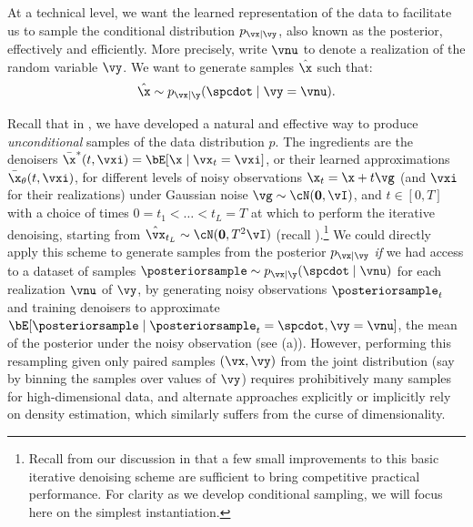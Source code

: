 \documentclass[../../book-main.tex]{subfiles}
\begin{document}
At a technical level, we want the learned representation of the data
to facilitate us to sample the conditional distribution $p_{\vx\mid
\vy}$, also known as the posterior, effectively and efficiently. More precisely,
write $\vnu$ to denote a realization of the random variable $\vy$.
We want to generate samples $\hat{\x}$ such that:
\begin{equation}\label{eq:goal-sample-posterior}
    \hat{\x} \sim   p_{\vx \mid \y}(\spcdot \mid \vy=\vnu).
\end{equation}

Recall that in , we have developed a natural and
effective way to produce \textit{unconditional} samples of the data distribution
$p$. The ingredients are the denoisers $\bar{\x}^\ast(t, \vxi) = \bE[ \x \mid
\vx_t=\vxi ]$, or their learned approximations $\bar{\x}_{\theta}(t, \vxi)$,
for different levels of noisy observations $\x_t = \x + t \vg$ (and $\vxi$ for
their realizations) under
Gaussian noise $\vg \sim \cN(\mathbf{0}, \vI)$, and $t \in
[0, T]$ with a choice of times $0 = t_1 < \dots < t_{L} = T$ at which to
perform the iterative denoising, starting from $\hat{\vx}_{t_L} \sim
\cN(\mathbf{0}, T^2 \vI)$ (recall
).\footnote{Recall from our
    discussion in 
    that a few small improvements to this basic iterative denoising scheme are
    sufficient to bring competitive practical performance. For
    clarity as we develop
conditional sampling, we will focus here on the simplest instantiation.}
We could directly apply this scheme to generate samples from the posterior
$p_{\vx \mid \vy}$ \textit{if} we had access to a dataset of samples
$\posteriorsample \sim p_{\vx \mid \y}(\spcdot \mid \vnu)$ for each realization
$\vnu$ of $\vy$, by generating noisy observations
$\posteriorsample_t$ and training denoisers to approximate $\bE[
\posteriorsample \mid \posteriorsample_t=\spcdot, \vy=\vnu ]$, the
mean of the posterior under
the noisy observation (see (a)).
However, performing this resampling given only paired samples $(\vx,
\vy)$ from the
joint distribution (say by binning the samples over values of $\vy$) requires
prohibitively many samples for high-dimensional data, and alternate approaches
explicitly or implicitly rely on density estimation, which similarly
suffers from the
curse of dimensionality.
\end{document}
